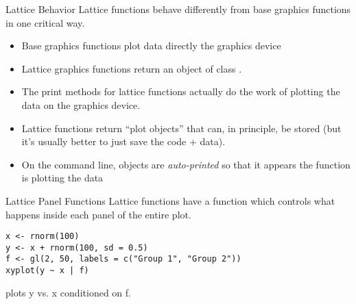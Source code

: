\documentclass[aspectratio=169]{beamer}
\begin{document}
\begin{frame}{Lattice Behavior}
Lattice functions behave differently from base graphics functions in
one critical way.
\begin{itemize}
\item
Base graphics functions plot data directly the graphics device
\item
Lattice graphics functions return an object of class .
\item
The print methods for lattice functions actually do the work of
plotting the data on the graphics device.
\item
Lattice functions return ``plot objects'' that can, in principle, be
stored (but it's usually better to just save the code + data).
\item
On the command line,  objects are \textit{auto-printed}
so that it appears the function is plotting the data
\end{itemize}
\end{frame}




\begin{frame}[fragile]{Lattice Panel Functions}
Lattice functions have a  function which controls what
happens inside each panel of the entire plot.
\begin{verbatim}
x <- rnorm(100)
y <- x + rnorm(100, sd = 0.5)
f <- gl(2, 50, labels = c("Group 1", "Group 2"))
xyplot(y ~ x | f)
\end{verbatim}
plots y vs. x conditioned on f.
\end{frame}
\end{document}
